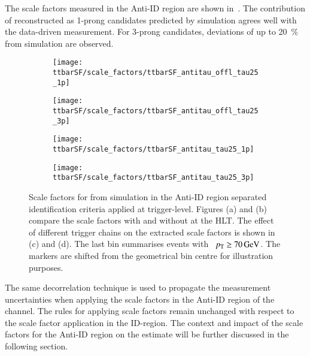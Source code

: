 The scale factors measured in the Anti-ID region are shown
in~. The contribution of \faketauhadvis
reconstructed as 1-prong candidates predicted by simulation agrees
well with the data-driven measurement. For 3-prong candidates,
deviations of up to \SI{20}{\percent} from simulation are observed.

\begin{figure}[htbp]
  \centering

  \begin{subfigure}[t]{.495\textwidth}
    \texttt{[image: ttbarSF/scale\_factors/ttbarSF\_antitau\_offl\_tau25\_1p]}
    \caption{}
    \label{fig:ttbarSF_antiid_SF_a}
  \end{subfigure}\hfill%
  \begin{subfigure}[t]{.495\textwidth}
    \texttt{[image: ttbarSF/scale\_factors/ttbarSF\_antitau\_offl\_tau25\_3p]}
    \caption{}
    \label{fig:ttbarSF_antiid_SF_b}
  \end{subfigure}

  \begin{subfigure}[t]{.495\textwidth}
    \texttt{[image: ttbarSF/scale\_factors/ttbarSF\_antitau\_tau25\_1p]}
    \caption{}
    \label{fig:ttbarSF_antiid_SF_c}
  \end{subfigure}\hfill%
  \begin{subfigure}[t]{.495\textwidth}
    \texttt{[image: ttbarSF/scale\_factors/ttbarSF\_antitau\_tau25\_3p]}
    \caption{}
    \label{fig:ttbarSF_antiid_SF_d}
  \end{subfigure}

  \caption{Scale factors for \faketauhadvis from \ttbar simulation in
    the Anti-ID region separated \tauhadvis identification criteria
    applied at trigger-level. Figures (a) and (b) compare the scale
    factors with and without \tauid at the HLT. The effect of
    different \tauhadvis trigger chains on the extracted scale factors
    is shown in (c) and (d). The last bin summarises events with
    \tauhadvis~$\pT \geq \SI{70}{\GeV}$. The markers are shifted from
    the geometrical bin centre for illustration purposes.}%
  \label{fig:ttbarSF_antiid_SF}
\end{figure}

The same decorrelation technique is used to propagate the measurement
uncertainties when applying the scale factors in the Anti-ID region of
the \hadhad channel. The rules for applying scale factors remain
unchanged with respect to the scale factor application in the
ID-region. The context and impact of the scale factors for the Anti-ID
region on the \multijet estimate will be further discussed in the
following section.




